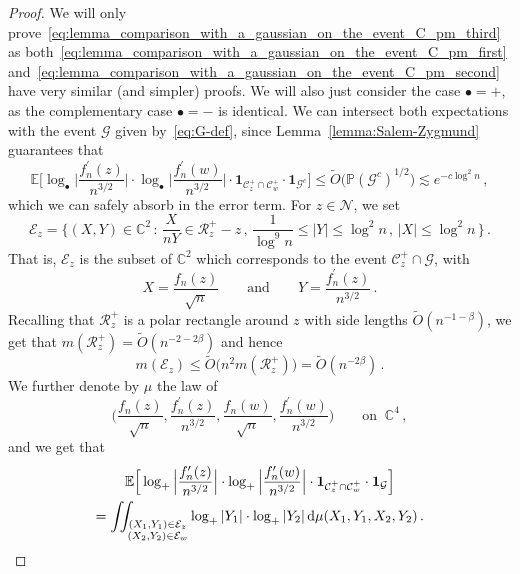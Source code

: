 \documentclass[11pt]{amsart}
\theoremstyle{remark}
\theoremstyle{definition}
\newcommand{\cR}{\mathcal R}
\newcommand{\bC}{\mathbb C}
\newcommand{\bP}{\mathbb P}
\newcommand{\bE}{\mathbb E}
\newcommand{\cE}{\mathcal{E}}
\newcommand{\cC}{\mathcal C}
\newcommand{\cN}{\mathcal N}
\newcommand{\cG}{\mathcal G}
\newcommand{\one}{\boldsymbol{1}}
\begin{document}
    \begin{proof}
        We will only prove~\eqref{eq:lemma_comparison_with_a_gaussian_on_the_event_C_pm_third} as both~\eqref{eq:lemma_comparison_with_a_gaussian_on_the_event_C_pm_first} and~\eqref{eq:lemma_comparison_with_a_gaussian_on_the_event_C_pm_second} have very similar (and simpler) proofs. We will also just consider the case $\bullet = +$, as the complementary case $\bullet = -$ is identical. We can intersect both expectations with the event $\cG$ given by~\eqref{eq:G-def}, since Lemma~\ref{lemma:Salem-Zygmund} guarantees that
        \[
        \bE\Big[ \log_\bullet \Big|\frac{f_n^\prime(z)}{n^{3/2}}\Big| \cdot \log_\bullet \Big|\frac{f_n^\prime(w)}{n^{3/2}}\Big| \cdot \one_{\cC_z^+\cap \cC_w^{+}} \cdot \one_{\cG^c} \Big] \le \widetilde{O}\big(\bP(\cG^c)^{1/2}\big) \lesssim e^{-c\log^2 n} \, ,
        \]
        which we can safely absorb in the error term. For $z\in \cN$, we set 
        \begin{equation}
        \label{eq:def_of_E_z}
            \mathcal{E}_z = \Big\{ (X,Y) \in \bC^2 \, : \,  \frac{X}{nY} \in \cR_z^+ -z \, , \, \frac1{\log^9 n} \le |Y| \le \log^2 n \, , \, |X|\le \log^2 n \, \Big\} \, .
        \end{equation}
        That is, $\cE_z$ is the subset of $\bC^2$ which corresponds to the event $\cC_z^+\cap\cG$, with 
        \[
        X = \frac{f_n(z)}{\sqrt{n}} \qquad \text{and} \qquad Y = \frac{f_n^\prime(z)}{n^{3/2}} \, .
        \]
        Recalling that $\cR_z^+$ is a polar rectangle around $z$ with side lengths $\widetilde{O}(n^{-1-\beta})$, we get that $m(\cR_z^+) = \widetilde{O}(n^{-2-2\beta})$ and hence
        \begin{equation}
            \label{eq:bound_on_measure_of_E_z}
            m(\cE_z) \le \widetilde{O}\big(n^2 m(\cR_z^+) \big) = \widetilde{O}(n^{-2\beta}) \, .
        \end{equation}We further denote by $\mu$ the law of
        \[
        \Big(\frac{f_n(z)}{\sqrt{n}},\frac{f_n^\prime(z)}{n^{3/2}},\frac{f_n(w)}{\sqrt{n}},\frac{f_n^\prime(w)}{n^{3/2}}\Big) \qquad \text{on } \ \bC^4\, ,
        \]
        and we get that 
        \begin{multline}
        \label{eq:expectaion_of_logs_in_complex_coordinates}
            \bE\Big[ \log_+ \Big|\frac{f_n^\prime(z)}{n^{3/2}}\Big| \cdot \log_+ \Big|\frac{f_n^\prime(w)}{n^{3/2}}\Big| \cdot \one_{\cC_z^+\cap \cC_w^{+}} \cdot \one_{\cG} \Big] \\  = \iint_{\substack{  (X_1,Y_1)\in \cE_z \\  (X_2,Y_2)\in \cE_w }} \log_+|Y_1| \cdot \log_+|Y_2| \, {\rm d}\mu(X_1,Y_1,X_2,Y_2) \, .

\end{multline}
\end{proof}
\end{document}
